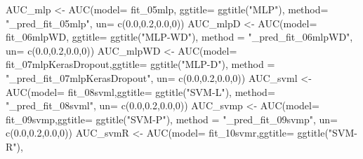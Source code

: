 \documentclass[
]{article}
\newenvironment{Shaded}{\begin{snugshade}}{\end{snugshade}}
\newcommand{\AttributeTok}[1]{\textcolor[rgb]{0.77,0.63,0.00}{#1}}
\newcommand{\DecValTok}[1]{\textcolor[rgb]{0.00,0.00,0.81}{#1}}
\newcommand{\FloatTok}[1]{\textcolor[rgb]{0.00,0.00,0.81}{#1}}
\newcommand{\FunctionTok}[1]{\textcolor[rgb]{0.00,0.00,0.00}{#1}}
\newcommand{\NormalTok}[1]{#1}
\newcommand{\OtherTok}[1]{\textcolor[rgb]{0.56,0.35,0.01}{#1}}
\newcommand{\StringTok}[1]{\textcolor[rgb]{0.31,0.60,0.02}{#1}}
\begin{document}
\begin{Shaded}
\begin{Highlighting}[]
\NormalTok{AUC\_mlp }\OtherTok{\textless{}{-}} \FunctionTok{AUC}\NormalTok{(}\AttributeTok{model=}\NormalTok{ fit\_05mlp, }\AttributeTok{ggtitle=} \FunctionTok{ggtitle}\NormalTok{(}\StringTok{"MLP"}\NormalTok{),}
                \AttributeTok{method=} \StringTok{"\_pred\_fit\_05mlp"}\NormalTok{,}
               \AttributeTok{un=} \FunctionTok{c}\NormalTok{(}\FloatTok{0.0}\NormalTok{,}\FloatTok{0.2}\NormalTok{,}\FloatTok{0.0}\NormalTok{,}\DecValTok{0}\NormalTok{))}
\NormalTok{AUC\_mlpD }\OtherTok{\textless{}{-}} \FunctionTok{AUC}\NormalTok{(}\AttributeTok{model=}\NormalTok{ fit\_06mlpWD, }\AttributeTok{ggtitle=} \FunctionTok{ggtitle}\NormalTok{(}\StringTok{"MLP{-}WD"}\NormalTok{),}
              \AttributeTok{method =} \StringTok{"\_pred\_fit\_06mlpWD"}\NormalTok{,}
               \AttributeTok{un=} \FunctionTok{c}\NormalTok{(}\FloatTok{0.0}\NormalTok{,}\FloatTok{0.2}\NormalTok{,}\FloatTok{0.0}\NormalTok{,}\DecValTok{0}\NormalTok{))}
\NormalTok{AUC\_mlpWD }\OtherTok{\textless{}{-}} \FunctionTok{AUC}\NormalTok{(}\AttributeTok{model=}\NormalTok{ fit\_07mlpKerasDropout,}\AttributeTok{ggtitle=} \FunctionTok{ggtitle}\NormalTok{(}\StringTok{"MLP{-}D"}\NormalTok{),}
               \AttributeTok{method =} \StringTok{"\_pred\_fit\_07mlpKerasDropout"}\NormalTok{,}
               \AttributeTok{un=} \FunctionTok{c}\NormalTok{(}\FloatTok{0.0}\NormalTok{,}\FloatTok{0.2}\NormalTok{,}\FloatTok{0.0}\NormalTok{,}\DecValTok{0}\NormalTok{))}
\NormalTok{AUC\_svml }\OtherTok{\textless{}{-}} \FunctionTok{AUC}\NormalTok{(}\AttributeTok{model=}\NormalTok{ fit\_08svml,}\AttributeTok{ggtitle=} \FunctionTok{ggtitle}\NormalTok{(}\StringTok{"SVM{-}L"}\NormalTok{),}
                \AttributeTok{method=} \StringTok{"\_pred\_fit\_08svml"}\NormalTok{,}
               \AttributeTok{un=} \FunctionTok{c}\NormalTok{(}\FloatTok{0.0}\NormalTok{,}\FloatTok{0.2}\NormalTok{,}\FloatTok{0.0}\NormalTok{,}\DecValTok{0}\NormalTok{))}
\NormalTok{AUC\_svmp }\OtherTok{\textless{}{-}} \FunctionTok{AUC}\NormalTok{(}\AttributeTok{model=}\NormalTok{ fit\_09svmp,}\AttributeTok{ggtitle=} \FunctionTok{ggtitle}\NormalTok{(}\StringTok{"SVM{-}P"}\NormalTok{),}
              \AttributeTok{method =} \StringTok{"\_pred\_fit\_09svmp"}\NormalTok{,}
               \AttributeTok{un=} \FunctionTok{c}\NormalTok{(}\FloatTok{0.0}\NormalTok{,}\FloatTok{0.2}\NormalTok{,}\FloatTok{0.0}\NormalTok{,}\DecValTok{0}\NormalTok{))}
\NormalTok{AUC\_svmR }\OtherTok{\textless{}{-}} \FunctionTok{AUC}\NormalTok{(}\AttributeTok{model=}\NormalTok{ fit\_10svmr,}\AttributeTok{ggtitle=} \FunctionTok{ggtitle}\NormalTok{(}\StringTok{"SVM{-}R"}\NormalTok{),}

\end{Highlighting}
\end{Shaded}
\end{document}
